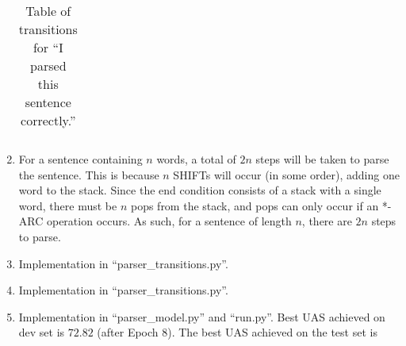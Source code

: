 \documentclass[12pt]{article}
\begin{document}
\begin{enumerate}[label=(\alph*)]
\begin{table}[h!]
\begin{tabular}{l|l|l|l}
    \end{tabular}
    \caption{Table of transitions for ``I parsed this sentence correctly.''}
    \label{table:parsing}
    \end{table}
  \item For a sentence containing $n$ words, a total of $2n$ steps will be taken to parse the sentence. This is because $n$ SHIFTs will occur (in some order), adding one word to the stack. Since the end condition consists of a stack with a single word, there must be $n$ pops from the stack, and pops can only occur if an *-ARC operation occurs. As such, for a sentence of length $n$, there are $2n$ steps to parse.
  \item Implementation in ``parser_transitions.py''.
  \item Implementation in ``parser_transitions.py''.
  \item Implementation in ``parser_model.py'' and ``run.py''. Best UAS achieved on dev set is $72.82$ (after Epoch 8). The best UAS achieved on the test set is 

\end{enumerate}
\end{document}
